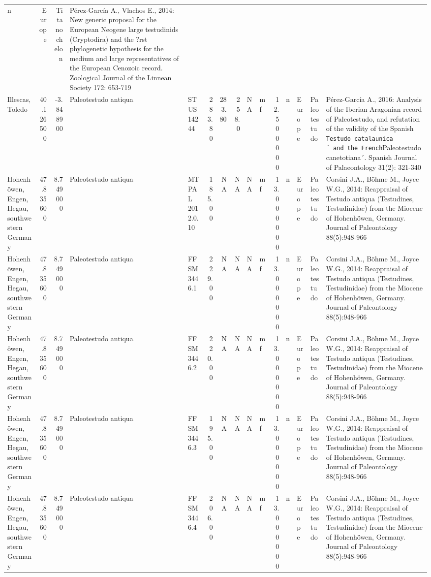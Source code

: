 \documentclass[]{article}
\begin{document}
\begin{longtable}[]{@{}lrrllrrrllrllll@{}}
n & Europe & Titanochelon & Pérez-García A., Vlachos E., 2014: New
generic proposal for the European Neogene large testudinids (Cryptodira)
and the ?rst phylogenetic hypothesis for the medium and large
representatives of the European Cenozoic record. Zoological Journal of
the Linnean Society 172: 653-719\tabularnewline
Illescas, Toledo & 40.126500 & -3.848900 & Paleotestudo antiqua & STUS
14244 & 283.80 & 283.80 & 258.0 & NA & mf & 12.500000 & n & Europe &
Paleotestudo & Pérez-García A., 2016: Analysis of the Iberian Aragonian
record of Paleotestudo, and refutation of the validity of the Spanish
\texttt{Testudo\ catalaunica´\ and\ the\ French}Paleotestudo
canetotiana´. Spanish Journal of Palaeontology 31(2):
321-340\tabularnewline
Hohenhöwen, Engen, Hegau, southwestern Germany & 47.835600 & 8.749000 &
Paleotestudo antiqua & MT PAL 2012.0.10 & 185.00 & NA & NA & NA & mf &
13.000000 & n & Europe & Paleotestudo & Corsini J.A., Böhme M., Joyce
W.G., 2014: Reappraisal of Testudo antiqua (Testudines, Testudinidae)
from the Miocene of Hohenhöwen, Germany. Journal of Paleontology
88(5):948-966\tabularnewline
Hohenhöwen, Engen, Hegau, southwestern Germany & 47.835600 & 8.749000 &
Paleotestudo antiqua & FFSM3446.1 & 229.00 & NA & NA & NA & mf &
13.000000 & n & Europe & Paleotestudo & Corsini J.A., Böhme M., Joyce
W.G., 2014: Reappraisal of Testudo antiqua (Testudines, Testudinidae)
from the Miocene of Hohenhöwen, Germany. Journal of Paleontology
88(5):948-966\tabularnewline
Hohenhöwen, Engen, Hegau, southwestern Germany & 47.835600 & 8.749000 &
Paleotestudo antiqua & FFSM 3446.2 & 220.00 & NA & NA & NA & mf &
13.000000 & n & Europe & Paleotestudo & Corsini J.A., Böhme M., Joyce
W.G., 2014: Reappraisal of Testudo antiqua (Testudines, Testudinidae)
from the Miocene of Hohenhöwen, Germany. Journal of Paleontology
88(5):948-966\tabularnewline
Hohenhöwen, Engen, Hegau, southwestern Germany & 47.835600 & 8.749000 &
Paleotestudo antiqua & FFSM 3446.3 & 195.00 & NA & NA & NA & mf &
13.000000 & n & Europe & Paleotestudo & Corsini J.A., Böhme M., Joyce
W.G., 2014: Reappraisal of Testudo antiqua (Testudines, Testudinidae)
from the Miocene of Hohenhöwen, Germany. Journal of Paleontology
88(5):948-966\tabularnewline
Hohenhöwen, Engen, Hegau, southwestern Germany & 47.835600 & 8.749000 &
Paleotestudo antiqua & FFSM 3446.4 & 206.00 & NA & NA & NA & mf &
13.000000 & n & Europe & Paleotestudo & Corsini J.A., Böhme M., Joyce
W.G., 2014: Reappraisal of Testudo antiqua (Testudines, Testudinidae)
from the Miocene of Hohenhöwen, Germany. Journal of Paleontology
88(5):948-966\tabularnewline

\end{longtable}
\end{document}
